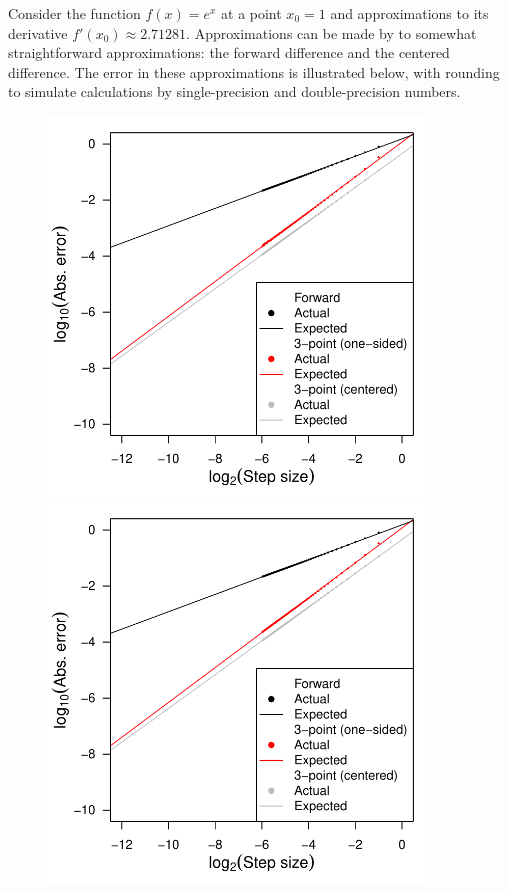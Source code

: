 \documentclass[12pt]{article}
\begin{document}
Consider the function \(f(x) = e^x\) at a point \(x_0=1\) and approximations to its derivative \(f'(x_0)\approx 2.71281\).  Approximations can be made by to somewhat straightforward approximations: the forward difference and the centered difference.  The error in these approximations is illustrated below, with rounding to simulate calculations by single-precision and double-precision numbers.

\begin{figure}[h!]\centering
\begin{minipage}{0.48\textwidth}
\includegraphics[width=0.9\textwidth]{step_size_8.pdf}

\end{minipage}
\begin{minipage}{0.48\textwidth}
\includegraphics[width=0.9\textwidth]{step_size_16.pdf}


\end{minipage}
\end{figure}
\end{document}
